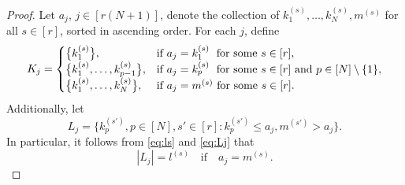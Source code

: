 \documentclass[11pt]{article}
\newcommand{\1}[1][]{
	\ifx&#1&\mathds{1}
	\else\mathds{1}\left\{#1\right\}\fi}
\theoremstyle{definition}
\theoremstyle{remark}
\numberwithin{equation}{section}
\begin{document}
	\begin{proof}
		Let $a_j$, $j\in[r(N+1)]$, denote the collection of $k_1^{(s)}, \dots, k_N^{(s)}, m^{(s)}$ for all $s\in[r]$, sorted in ascending order. For each $j$, define 
		\begin{equation}
			\label{eq:Kj}
			K_j = \begin{cases}
				\bigl\{k_1^{(s)}\bigr\}, &\text{if } a_j = k_1^{(s)}\text{\hspace{6.3pt}for some }s\in[r],\\
				\bigl\{k_1^{(s)},\ldots,k_{p-1}^{(s)}\bigr\},
				&\text{if } a_j = k_p^{(s)}\text{\hspace{6.3pt}for some }s\in[r]\text{ and }p\in[N]\setminus\{1\},\\
				\bigl\{k_1^{(s)}, \dots, k_N^{(s)}\bigr\},
				&\text{if } a_j = m^{(s)}\text{ for some }s\in[r].
			\end{cases}
		\end{equation}
		Additionally, let
		\begin{equation}
			\label{eq:Lj}
			L_j = \bigl\{k_p^{(s')},p\in[N],s'\in[r]: k_p^{(s')} \le a_j, m^{(s')}>a_j\bigr\}.
		\end{equation}
		In particular, it follows from \eqref{eq:ls} and \eqref{eq:Lj} that
		\begin{equation}
			\label{eq:ml}
			|L_j| = l^{(s)} \quad\text{if}\quad a_j=m^{(s)}.
		\end{equation}
		

\end{proof}
\end{document}
